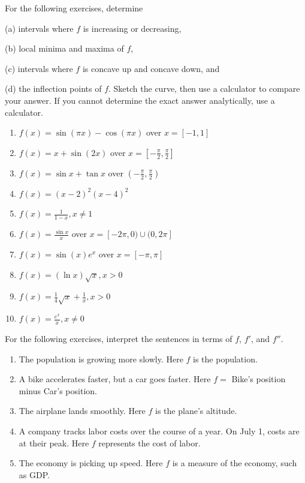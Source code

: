 \documentclass{exercises}
\begin{document}
For the following exercises, determine


(a) intervals where $f$ is increasing or decreasing,


(b) local minima and maxima of $f$,


(c) intervals where $f$ is concave up and concave down, and


(d) the inflection points of $f$. Sketch the curve, then use a calculator to compare your answer. If you cannot determine the exact answer analytically, use a calculator.

\begin{enumerate}[resume]
\item \techrequired $f(x)=\sin(\pi x)-\cos(\pi x)$ over $x=[-1,1]$
\item \techrequired $f(x)=x+\sin(2x)$ over $x=[-\frac{\pi}{2},\frac{\pi}{2}]$
\item \techrequired $f(x)=\sin x+\tan x$ over $(-\frac{\pi}{2},\frac{\pi}{2})$
\item \techrequired $f(x)={(x-2)}^{2}{(x-4)}^{2}$
\item \techrequired $f(x)=\frac{1}{1-x},x\ne1$
\item \techrequired $f(x)=\frac{\sin x}{x}$ over $x=[-2\pi,0)\cup(0,2\pi]$
\item $f(x)=\sin(x)e^{x}$ over $x=[-\pi,\pi]$
\item $f(x)=(\ln x)\sqrt{x},x>0$
\item $f(x)=\frac{1}{4}\sqrt{x}+\frac{1}{x},x>0$
\item $f(x)=\frac{e^{x}}{x},x\ne0$
\end{enumerate}

For the following exercises, interpret the sentences in terms of $f$, $f'$, and $f''$.

\begin{enumerate}[resume]
\item The population is growing more slowly. Here $f$ is the population.
\item A bike accelerates faster, but a car goes faster. Here $f=$ Bike's position minus Car's position.
\item The airplane lands smoothly. Here $f$ is the plane's altitude.
\item A company tracks labor costs over the course of a year. On July 1, costs are at their peak. Here $f$ represents the cost of labor.
\item The economy is picking up speed. Here $f$ is a measure of the economy, such as GDP.
\end{enumerate}
\end{document}
